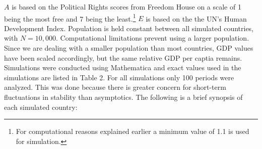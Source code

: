 \documentclass[12pt]{article}
\begin{document}
\begin{spacing}{1.5}
$A$ is based on the Political Rights scores from Freedom House on a scale of 1 being the most free and 7 being the least.\footnote{For computational reasons explained earlier a minimum value of 1.1 is used for simulation.} $E$ is based on the the UN's Human Development Index. Population is held constant between all simulated countries, with $N=10,000$. Computational limitations prevent using a larger population. Since we are dealing with a smaller population than most countries, GDP values have been scaled accordingly, but the same relative GDP per captia remains. Simulations were conducted using Mathematica and exact values used in the simulations are listed in Table 2. For all simulations only 100 periods were analyzed. This was done because there is greater concern for short-term fluctuations in stability than asymptotics. The following is a brief synopsis of each simulated country:  
 

\end{spacing}
\end{document}
